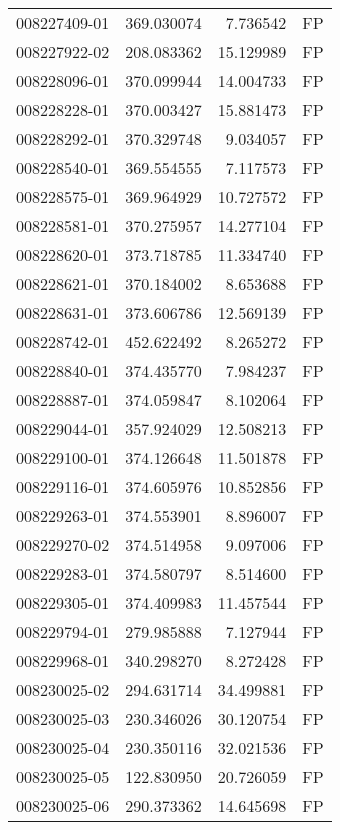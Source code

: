 \begin{tabular}{lrrl}
008227409-01 &  369.030074 &       7.736542 &   FP \\
008227922-02 &  208.083362 &      15.129989 &   FP \\
008228096-01 &  370.099944 &      14.004733 &   FP \\
008228228-01 &  370.003427 &      15.881473 &   FP \\
008228292-01 &  370.329748 &       9.034057 &   FP \\
008228540-01 &  369.554555 &       7.117573 &   FP \\
008228575-01 &  369.964929 &      10.727572 &   FP \\
008228581-01 &  370.275957 &      14.277104 &   FP \\
008228620-01 &  373.718785 &      11.334740 &   FP \\
008228621-01 &  370.184002 &       8.653688 &   FP \\
008228631-01 &  373.606786 &      12.569139 &   FP \\
008228742-01 &  452.622492 &       8.265272 &   FP \\
008228840-01 &  374.435770 &       7.984237 &   FP \\
008228887-01 &  374.059847 &       8.102064 &   FP \\
008229044-01 &  357.924029 &      12.508213 &   FP \\
008229100-01 &  374.126648 &      11.501878 &   FP \\
008229116-01 &  374.605976 &      10.852856 &   FP \\
008229263-01 &  374.553901 &       8.896007 &   FP \\
008229270-02 &  374.514958 &       9.097006 &   FP \\
008229283-01 &  374.580797 &       8.514600 &   FP \\
008229305-01 &  374.409983 &      11.457544 &   FP \\
008229794-01 &  279.985888 &       7.127944 &   FP \\
008229968-01 &  340.298270 &       8.272428 &   FP \\
008230025-02 &  294.631714 &      34.499881 &   FP \\
008230025-03 &  230.346026 &      30.120754 &   FP \\
008230025-04 &  230.350116 &      32.021536 &   FP \\
008230025-05 &  122.830950 &      20.726059 &   FP \\
008230025-06 &  290.373362 &      14.645698 &   FP \\

\end{tabular}

